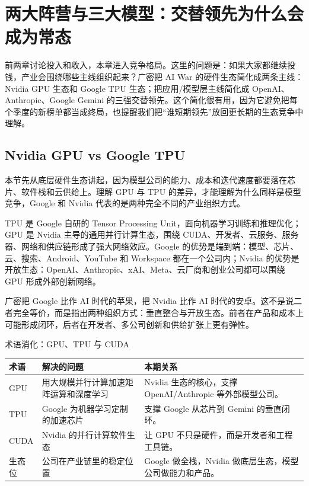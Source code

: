 \section{两大阵营与三大模型：交替领先为什么会成为常态}

前两章讨论投入和收入，本章进入竞争格局。这里的问题是：如果大家都继续投钱，产业会围绕哪些主线组织起来？广密把 AI War 的硬件生态简化成两条主线：Nvidia GPU 生态和 Google TPU 生态；把应用/模型层主线简化成 OpenAI、Anthropic、Google Gemini 的三强交替领先。这个简化很有用，因为它避免把每个季度的新榜单都当成终局，也提醒我们把“谁短期领先”放回更长期的生态竞争中理解。

\subsection{Nvidia GPU vs Google TPU}

本节先从底层硬件生态讲起，因为模型公司的能力、成本和迭代速度都要落在芯片、软件栈和云供给上。理解 GPU 与 TPU 的差异，才能理解为什么同样是模型竞争，Google 和 Nvidia 代表的是两种完全不同的产业组织方式。

TPU 是 Google 自研的 Tensor Processing Unit，面向机器学习训练和推理优化；GPU 是 Nvidia 主导的通用并行计算生态，围绕 CUDA、开发者、云服务、服务器、网络和供应链形成了强大网络效应。Google 的优势是端到端：模型、芯片、云、搜索、Android、YouTube 和 Workspace 都在一个公司内；Nvidia 的优势是开放生态：OpenAI、Anthropic、xAI、Meta、云厂商和创业公司都可以围绕 GPU 形成外部创新网络。

广密把 Google 比作 AI 时代的苹果，把 Nvidia 比作 AI 时代的安卓。这不是说二者完全等价，而是指出两种组织方式：垂直整合与开放生态。前者在产品和成本上可能形成闭环，后者在开发者、多公司创新和供给扩张上更有弹性。

\begin{knowledgebox}{术语消化：GPU、TPU 与 CUDA}
\begin{tabularx}{\textwidth}{p{}p{}X}
\toprule
术语 & 解决的问题 & 本期关系 \\
\midrule
GPU & 用大规模并行计算加速矩阵运算和深度学习 & Nvidia 生态的核心，支撑 OpenAI/Anthropic 等外部模型公司。 \\
TPU & Google 为机器学习定制的加速芯片 & 支撑 Google 从芯片到 Gemini 的垂直闭环。 \\
CUDA & Nvidia 的并行计算软件生态 & 让 GPU 不只是硬件，而是开发者和工程工具链。 \\
生态位 & 公司在产业链里的稳定位置 & Google 做全栈，Nvidia 做底层生态，模型公司做能力和产品。 \\
\bottomrule
\end{tabularx}
\end{knowledgebox}


